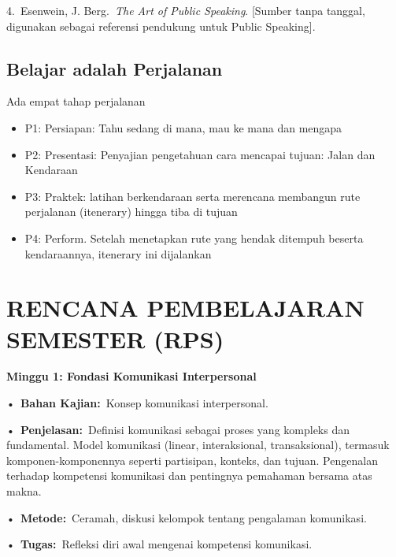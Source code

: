 \documentclass[
  letterpaper,
  DIV=11,
  numbers=noendperiod]{scrreprt}
\begin{document}
4.~Esenwein, J. Berg.~\emph{The Art of Public Speaking}. {[}Sumber tanpa
tanggal, digunakan sebagai referensi pendukung untuk Public Speaking{]}.

\section*{Belajar adalah Perjalanan}\label{belajar-adalah-perjalanan}


Ada empat tahap perjalanan

\begin{itemize}
\item
  P1: Persiapan: Tahu sedang di mana, mau ke mana dan mengapa
\item
  P2: Presentasi: Penyajian pengetahuan cara mencapai tujuan: Jalan dan
  Kendaraan
\item
  P3: Praktek: latihan berkendaraan serta merencana membangun rute
  perjalanan (itenerary) hingga tiba di tujuan
\item
  P4: Perform. Setelah menetapkan rute yang hendak ditempuh beserta
  kendaraannya, itenerary ini dijalankan
\end{itemize}


\chapter*{RENCANA PEMBELAJARAN SEMESTER
(RPS)}\label{rencana-pembelajaran-semester-rps}


\textbf{Minggu 1: Fondasi Komunikasi Interpersonal}

•~\textbf{Bahan Kajian:}~Konsep komunikasi interpersonal.

•~\textbf{Penjelasan:}~Definisi komunikasi sebagai proses yang kompleks
dan fundamental. Model komunikasi (linear, interaksional,
transaksional), termasuk komponen-komponennya seperti partisipan,
konteks, dan tujuan. Pengenalan terhadap kompetensi komunikasi dan
pentingnya pemahaman bersama atas makna.

•~\textbf{Metode:}~Ceramah, diskusi kelompok tentang pengalaman
komunikasi.

•~\textbf{Tugas:}~Refleksi diri awal mengenai kompetensi komunikasi.
\end{document}
